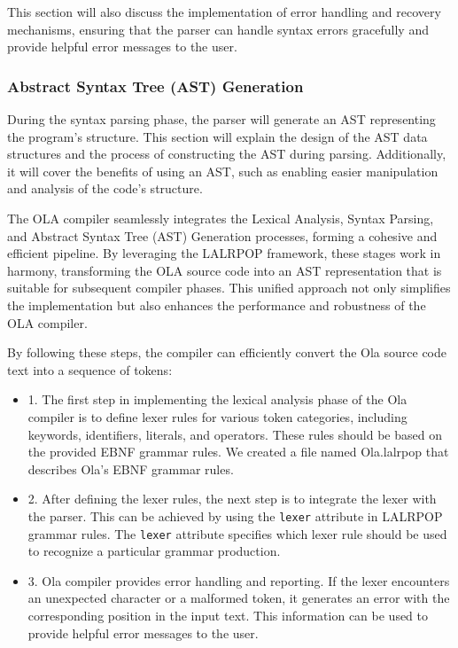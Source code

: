 This section will also discuss the implementation of error handling and recovery mechanisms, ensuring that the parser can handle syntax errors gracefully and provide helpful error messages to the user.

\subsubsection{Abstract Syntax Tree (AST) Generation}
During the syntax parsing phase, the parser will generate an AST representing the program's structure. This section will explain the design of the AST data structures and the process of constructing the AST during parsing. Additionally, it will cover the benefits of using an AST, such as enabling easier manipulation and analysis of the code's structure.

The OLA compiler seamlessly integrates the Lexical Analysis, Syntax Parsing, and Abstract Syntax Tree (AST) Generation processes, forming a cohesive and efficient pipeline. By leveraging the LALRPOP framework, these stages work in harmony, transforming the OLA source code into an AST representation that is suitable for subsequent compiler phases. This unified approach not only simplifies the implementation but also enhances the performance and robustness of the OLA compiler.

By following these steps, the compiler can efficiently convert the Ola source code text into a sequence of tokens:

\begin{itemize}

  \item 1. The first step in implementing the lexical analysis phase of the Ola compiler is to define lexer rules for various token categories, including keywords, identifiers, literals, and operators. These rules should be based on the provided EBNF grammar rules. We created a file named Ola.lalrpop that describes Ola's EBNF grammar rules.

  \item 2. After defining the lexer rules, the next step is to integrate the lexer with the parser. This can be achieved by using the \texttt{lexer} attribute in LALRPOP grammar rules. The \texttt{lexer} attribute specifies which lexer rule should be used to recognize a particular grammar production.

  \item 3. Ola compiler provides error handling and reporting. If the lexer encounters an unexpected character or a malformed token, it generates an error with the corresponding position in the input text. This information can be used to provide helpful error messages to the user.

\end{itemize}

